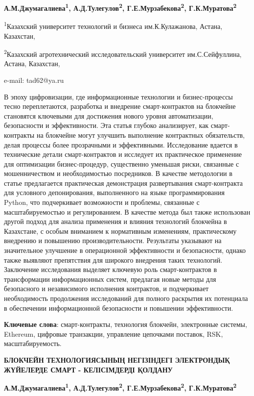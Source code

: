 {\bfseries А.М.Джумагалиева\textsuperscript{1},
А.Д.Тулегулов\textsuperscript{2}, Г.Е.Мурзабекова\textsuperscript{2},
Г.К.Муратова\textsuperscript{2}}

\textsuperscript{1}Казахский университет технологий и бизнеса
им.К.Кулажанова, Астана, Казахстан,

\textsuperscript{2}Казахский агротехнический исследовательский
университет им.С.Сейфуллина, Астана, Казахстан,

e-mail: tad62@ya.ru

В эпоху цифровизации, где информационные технологии и бизнес-процессы
тесно переплетаются, разработка и внедрение смарт-контрактов на
блокчейне становятся ключевыми для достижения нового уровня
автоматизации, безопасности и эффективности. Эта статья глубоко
анализирует, как смарт-контракты на блокчейне могут улучшить выполнение
контрактных обязательств, делая процессы более прозрачными и
эффективными. Исследование вдается в технические детали смарт-контрактов
и исследует их практическое применение для оптимизации бизнес-процедур,
существенно уменьшая риски, связанные с мошенничеством и необходимостью
посредников. В качестве методологии в статье предлагается практическая
демонстрация развертывания смарт-контракта для условного депонирования,
выполненного на языке программирования Python, что подчеркивает
возможности и проблемы, связанные с масштабируемостью и регулированием.
В качестве метода был также использован другой подход для анализа
применения и влияния технологий блокчейна в Казахстане, с особым
вниманием к нормативным изменениям, практическому внедрению и повышению
производительности. Результаты указывают на значительное улучшение в
операционной эффективности и безопасности, однако также выявляют
препятствия для широкого внедрения таких технологий. Заключение
исследования выделяет ключевую роль смарт-контрактов в трансформации
информационных систем, предлагая новые методы для безопасного и
независимого исполнения контрактов, и подчеркивает необходимость
продолжения исследований для полного раскрытия их потенциала в
обеспечении информационной безопасности и повышении эффективности.

{\bfseries Ключевые слова}: смарт-контракты, технология блокчейн,
электронные системы, Ethereum, цифровые транзакции, управление цепочками
поставок, RSK, масштабируемость.

{\bfseries БЛОКЧЕЙН ТЕХНОЛОГИЯСЫНЫҢ НЕГІЗІНДЕГІ ЭЛЕКТРОНДЫҚ ЖҮЙЕЛЕРДЕ СМАРТ
- КЕЛІСІМДЕРДІ ҚОЛДАНУ}

{\bfseries А.М.Джумагалиева\textsuperscript{1},
А.Д.Тулегулов\textsuperscript{2}, Г.Е.Мурзабекова\textsuperscript{2},
Г.К.Муратова\textsuperscript{2}}

